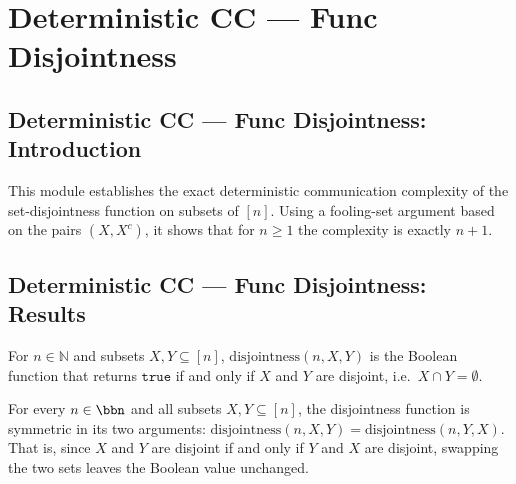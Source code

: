 \section{Deterministic CC --- Func Disjointness}
\subsection*{Deterministic CC --- Func Disjointness: Introduction}

This module establishes the exact deterministic communication complexity of the
set-disjointness function on subsets of $[n]$.  Using a fooling-set argument based on
the pairs $(X, X^c)$, it shows that for $n \ge 1$ the complexity is exactly $n + 1$.

\subsection*{Deterministic CC --- Func Disjointness: Results}

\begin{definition}
\label{CommunicationComplexity.Functions.Disjointness.disjointness}
\leanok
For $n \in \mathbb{N}$ and subsets $X, Y \subseteq [n]$, $\mathrm{disjointness}(n, X, Y)$
is the Boolean function that returns $\mathtt{true}$ if and only if $X$ and $Y$ are
disjoint, i.e.\ $X \cap Y = \emptyset$.
\end{definition}

\begin{theorem}
\label{CommunicationComplexity.Functions.Disjointness.disjointness_comm}
\leanok
{}
For every $n \in \bbn$ and all subsets $X, Y \subseteq [n]$, the disjointness function
is symmetric in its two arguments: $\mathrm{disjointness}(n, X, Y) =
\mathrm{disjointness}(n, Y, X)$. That is, since $X$ and $Y$ are disjoint if and only if
$Y$ and $X$ are disjoint, swapping the two sets leaves the Boolean value unchanged.
\end{theorem}


